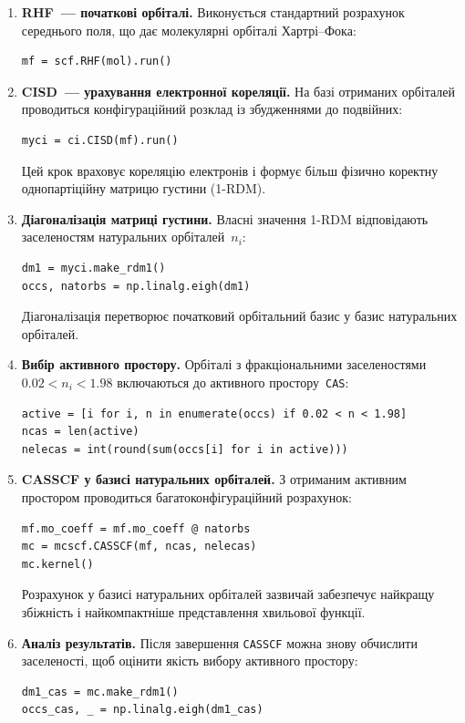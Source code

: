 \begin{enumerate}
	\item \textbf{RHF~--- початкові орбіталі.}
	      Виконується стандартний розрахунок середнього поля, що дає молекулярні орбіталі Хартрі–Фока:
	      \begin{verbatim}
mf = scf.RHF(mol).run()
	\end{verbatim}

	\item \textbf{CISD~--- урахування електронної кореляції.}
	      На базі отриманих орбіталей проводиться конфігураційний розклад із збудженнями до подвійних:
	      \begin{verbatim}
myci = ci.CISD(mf).run()
	\end{verbatim}
	      Цей крок враховує кореляцію електронів і формує більш фізично коректну однопартіційну матрицю густини (1-RDM).

	\item \textbf{Діагоналізація матриці густини.}
	      Власні значення 1-RDM відповідають заселеностям натуральних орбіталей~$n_i$:
	      \begin{verbatim}
dm1 = myci.make_rdm1()
occs, natorbs = np.linalg.eigh(dm1)
	\end{verbatim}
	      Діагоналізація перетворює початковий орбітальний базис у базис натуральних орбіталей.

	\item \textbf{Вибір активного простору.}
	      Орбіталі з фракціональними заселеностями
	      $0.02 < n_i < 1.98$ включаються до активного простору~\texttt{CAS}:
	      \begin{verbatim}
active = [i for i, n in enumerate(occs) if 0.02 < n < 1.98]
ncas = len(active)
nelecas = int(round(sum(occs[i] for i in active)))
	\end{verbatim}

	\item \textbf{CASSCF у базисі натуральних орбіталей.}
	      З отриманим активним простором проводиться багатоконфігураційний розрахунок:
	      \begin{verbatim}
mf.mo_coeff = mf.mo_coeff @ natorbs
mc = mcscf.CASSCF(mf, ncas, nelecas)
mc.kernel()
	\end{verbatim}
	      Розрахунок у базисі натуральних орбіталей зазвичай забезпечує найкращу збіжність і найкомпактніше представлення хвильової функції.

	\item \textbf{Аналіз результатів.}
	      Після завершення \texttt{CASSCF} можна знову обчислити заселеності, щоб оцінити якість вибору активного простору:
	      \begin{verbatim}
dm1_cas = mc.make_rdm1()
occs_cas, _ = np.linalg.eigh(dm1_cas)
	\end{verbatim}
\end{enumerate}


